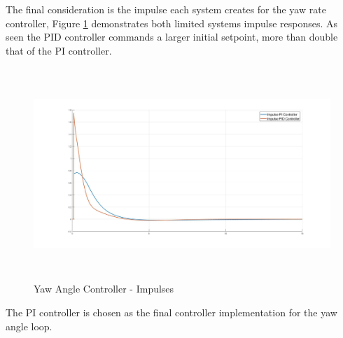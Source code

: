 \documentclass[12pt]{report}
\begin{document}
The final consideration is the impulse each system creates for the yaw rate controller, Figure \ref{IM_YawAngleImpulse} demonstrates both limited systems impulse responses. As seen the PID controller commands a larger initial setpoint, more than double that of the PI controller.    

\begin{figure}[H]
	\centering
	\includegraphics[height = 8cm]{../Design/Matlab/Controllers/yaw_angle_impulse.jpg}
	\caption{Yaw Angle Controller -  Impulses}
	\label{IM_YawAngleImpulse}
\end{figure}

The PI controller is chosen as the final controller implementation for the yaw angle loop. 
\end{document}
